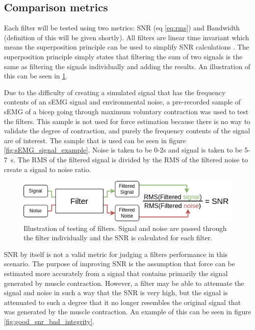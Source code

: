 \subsection{Comparison metrics}
Each filter will be tested using two metrics: SNR (eq \ref{eq:rms}) and Bandwidth (definition of this will be given shortly). All filters are linear time invariant which means the superposition principle can be used to simplify SNR calculations \cite{linear_systems_theory}. The superposition principle simply states that filtering the sum of two signals is the same as filtering the signals individually and adding the results. An illustration of this can be seen in \ref{fig:filter_process}. 

Due to the difficulty of creating a simulated signal that has the frequency contents of an sEMG signal and environmental noise, a pre-recorded sample of sEMG of a bicep going through maximum voluntary contraction was used to test the filters. This sample is not used for force estimation because there is no way to validate the degree of contraction, and purely the frequency contents of the signal are of interest. The sample that is used can be seen in figure \ref{fig:sEMG_signal_example}. Noise is taken to be 0-2s and signal is taken to be 5-\SI{7}{\second}. The RMS of the filtered signal is divided by the RMS of the filtered noise to create a signal to noise ratio.

\begin{figure}[h!t]
	\begin{center}
		\includegraphics[width=1.0\columnwidth]{images/filter_process.png}
	\end{center}
	\caption{Illustration of testing of filters. Signal and noise are passed through the filter individually and the SNR is calculated for each filter.}
	\label{fig:filter_process}
\end{figure}

SNR by itself is not a valid metric for judging a filters performance in this scenario. The purpose of improving SNR is the assumption that force can be estimated more accurately from a signal that contains primarily the signal generated by muscle contraction. However, a filter may be able to attenuate the signal and noise in such a way that the SNR is very high, but the signal is attenuated to such a degree that it no longer resembles the original signal that was generated by the muscle contraction. An example of this can be seen in figure \ref{fig:good_snr_bad_integrity}. 

